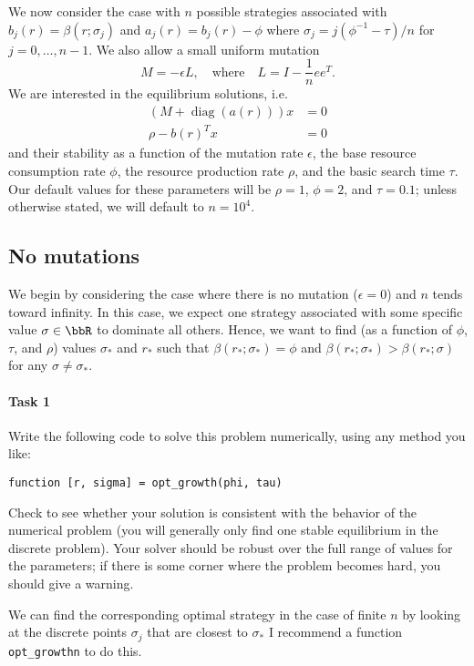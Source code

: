 \documentclass[12pt, leqno]{article} %
\begin{document}
We now consider the case with $n$ possible strategies associated with
$b_j(r) = \beta(r; \sigma_j)$ and $a_j(r) = b_j(r)-\phi$ where
$\sigma_{j} = j (\phi^{-1}-\tau)/n$ for $j = 0, \ldots, n-1$.
We also allow a small uniform mutation
\[
  M = -\epsilon L, \quad \mbox{where} \quad L = I - \frac{1}{n} ee^T.
\]
We are interested in the equilibrium solutions, i.e.
\begin{align*}
  \left(M + \operatorname{diag}(a(r))\right)x &= 0\\
  \rho - b(r)^T x &= 0
\end{align*}
and their stability as a function of the mutation rate $\epsilon$, the
base resource consumption rate $\phi$, the resource production rate
$\rho$, and the basic search time $\tau$.  Our default values for
these parameters will be $\rho = 1$, $\phi = 2$, and $\tau = 0.1$;
unless otherwise stated, we will default to $n = 10^4$.

\subsection{No mutations}

We begin by considering the case where there is no mutation ($\epsilon
= 0$) and $n$ tends toward infinity.  In this case, we expect one
strategy associated with some specific value $\sigma \in \bbR$ to
dominate all others.  Hence, we want to find (as a function of $\phi$,
$\tau$, and $\rho$) values $\sigma_*$ and $r_*$ such that
$\beta(r_*; \sigma_*) = \phi$ and
$\beta(r_*; \sigma_*) > \beta(r_*; \sigma)$ for any $\sigma \neq \sigma_*$.

\paragraph{Task 1}
Write the following code to solve this problem numerically,
using any method you like:
\begin{lstlisting}[frame=single]
function [r, sigma] = opt_growth(phi, tau)
\end{lstlisting}
Check to see whether your solution is consistent with the behavior
of the numerical problem (you will generally only find one
stable equilibrium in the discrete problem).  Your solver should
be robust over the full range of values for the parameters;
if there is some corner where the problem becomes hard, you should
give a warning.

We can find the corresponding optimal strategy in the case of finite
$n$ by looking at the discrete points $\sigma_j$ that are closest to
$\sigma_*$  I recommend a function \verb|opt_growthn| to do this.
\end{document}
